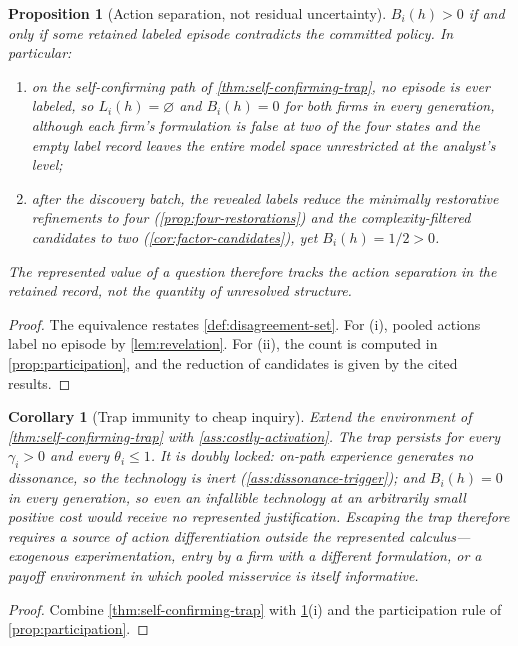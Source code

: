 \documentclass[11pt]{article}
\newtheorem{proposition}[assumption]{Proposition}
\newtheorem{corollary}[assumption]{Corollary}
\newcommand{\emptysetset}{\varnothing}
\begin{document}
\begin{proposition}[Action separation, not residual uncertainty]
\label{prop:action-separation}
$B_i(h)>0$ if and only if some retained labeled episode contradicts the
committed policy.  In particular:
\begin{enumerate}[label=(\roman*)]
  \item on the self-confirming path of \cref{thm:self-confirming-trap}, no
  episode is ever labeled, so $L_i(h)=\emptysetset$ and $B_i(h)=0$ for both
  firms in every generation, although each firm's formulation is false at two
  of the four states and the empty label record leaves the entire model space
  unrestricted at the analyst's level;
  \item after the discovery batch, the revealed labels reduce the minimally
  restorative refinements to four (\cref{prop:four-restorations}) and the
  complexity-filtered candidates to two
  (\cref{cor:factor-candidates}), yet $B_i(h)=1/2>0$.
\end{enumerate}
The represented value of a question therefore tracks the action separation in
the retained record, not the quantity of unresolved structure.
\end{proposition}

\begin{proof}
The equivalence restates \cref{def:disagreement-set}.  For (i), pooled actions
label no episode by \cref{lem:revelation}.  For (ii), the count is computed in
\cref{prop:participation}, and the reduction of candidates is given by the
cited results.
\end{proof}

\begin{corollary}[Trap immunity to cheap inquiry]
\label{cor:trap-immunity}
Extend the environment of \cref{thm:self-confirming-trap} with
\cref{ass:costly-activation}.  The trap persists for every $\gamma_i>0$ and
every $\theta_i\leq1$.  It is doubly locked: on-path experience generates no
dissonance, so the technology is inert (\cref{ass:dissonance-trigger}); and
$B_i(h)=0$ in every generation, so even an infallible technology at an
arbitrarily small positive cost would receive no represented justification.
Escaping the trap therefore requires a source of action differentiation
outside the represented calculus---exogenous experimentation, entry by a firm
with a different formulation, or a payoff environment in which pooled
misservice is itself informative.
\end{corollary}

\begin{proof}
Combine \cref{thm:self-confirming-trap} with
\cref{prop:action-separation}(i) and the participation rule of
\cref{prop:participation}.
\end{proof}
\end{document}
